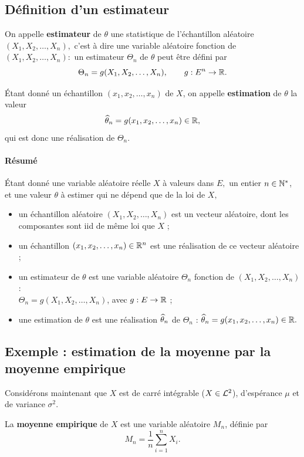 \subsection{Définition d'un estimateur}
On appelle \textbf{estimateur} de $\theta$ une statistique de l'échantillon
aléatoire $(X_1, X_2, \dots, X_n),$ c'est à dire une variable aléatoire
fonction de $(X_1, X_2, \dots, X_n) :$ un estimateur $\Theta_n$ de $\theta$
peut être défini par 
\[
  \Theta_n = g(X_1, X_2, \dots, X_n), \qquad g: E^n \to \mathbb{R}.
\]

Étant donné un échantillon $(x_1, x_2, \dots, x_n)$ de $X$, on appelle
\textbf{estimation} de $\theta$ la valeur
\[
  {\widehat \theta}_n = g(x_1, x_2, \dots, x_n) \in \mathbb{R},
\]
qui est donc une réalisation de $\Theta_n$.

\paragraph{Résumé}
Étant donné une variable aléatoire réelle $X$ à valeurs dans $E,$ un entier
$n \in \mathbb{N}^*$, et une valeur $\theta$ à estimer qui ne dépend que de la loi de
$X,$
\begin{itemize}
\item un échantillon aléatoire $(X_1, X_2, \dots, X_n)$ est un vecteur
  aléatoire, dont les composantes sont iid de même loi que $X$ ;
\item un échantillon $(x_1, x_2, \dots, x_n) \in \mathbb{R}^n$ est une réalisation de
  ce vecteur aléatoire ;
\item un estimateur de $\theta$ est une variable aléatoire $\Theta_n$ fonction
  de $(X_1, X_2, \dots, X_n)$ : \\ $\Theta_n = g(X_1, X_2, \dots, X_n)$, avec $g: E \to \mathbb{R}$ ;
\item une estimation de $\theta$ est une réalisation ${\widehat \theta}_n$ de
  $\Theta_n$ : ${\widehat \theta}_n = g(x_1, x_2, \dots, x_n) \in \mathbb{R}.$
\end{itemize}

\subsection{Exemple : estimation de la moyenne par la moyenne empirique}
Considérons maintenant que $X$ est de carré intégrable ($X \in \mathcal{L}^2$),
d'espérance $\mu$ et de variance $\sigma^2$.

La \textbf{moyenne empirique} de $X$ est une variable aléatoire $M_n$, définie
par
\begin{equation}
  M_n = \frac1n \sum_{i=1}^n X_i.
  \label{eq:moyenne_empirique}
\end{equation}

